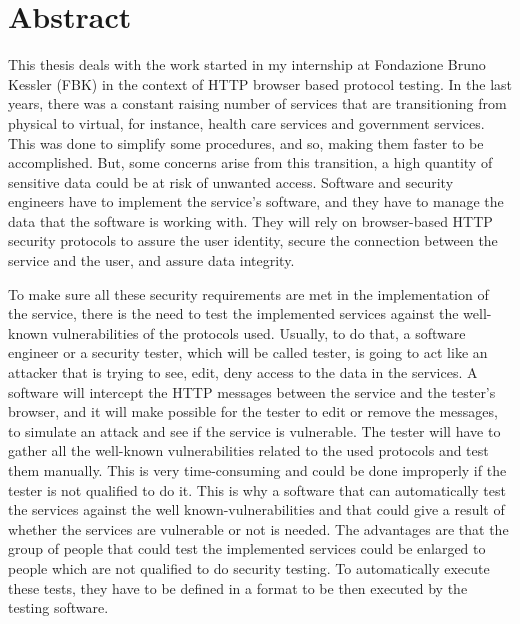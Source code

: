 \chapter*{Abstract} %

This thesis deals with the work started in my internship at Fondazione Bruno Kessler (FBK) in the context of HTTP browser based protocol testing.
In the last years, there was a constant raising number of services that are transitioning from physical to virtual, for instance, health care services and government services. This was done to simplify some procedures, and so, making them faster to be accomplished. But, some concerns arise from this transition, a high quantity of sensitive data could be at risk of unwanted access. Software and security engineers have to implement the service's software, and they have to manage the data that the software is working with. They will rely on browser-based HTTP security protocols to assure the user identity, secure the connection between the service and the user, and assure data integrity. 

To make sure all these security requirements are met in the implementation of the service, there is the need to test the implemented services against the well-known vulnerabilities of the protocols used. Usually, to do that, a software engineer or a security tester, which will be called tester, is going to act like an attacker that is trying to see, edit, deny access to the data in the services. A software will intercept the HTTP messages between the service and the tester's browser, and it will make possible for the tester to edit or remove the messages, to simulate an attack and see if the service is vulnerable. The tester will have to gather all the well-known vulnerabilities related to the used protocols and test them manually. This is very time-consuming and could be done improperly if the tester is not qualified to do it. This is why a software that can automatically test the services against the well known-vulnerabilities and that could give a result of whether the services are vulnerable or not is needed. The advantages are that the group of people that could test the implemented services could be enlarged to people which are not qualified to do security testing. To automatically execute these tests, they have to be defined in a format to be then executed by the testing software. 

